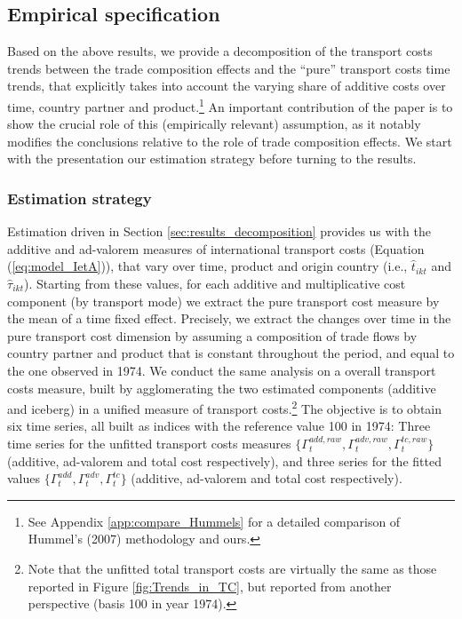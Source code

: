 \documentclass[a4paper,11pt]{article}
\begin{document}
\subsection{Empirical specification}

Based on the above results, we provide a decomposition of the transport costs trends between the trade composition effects and the ``pure'' transport costs time trends, that explicitly takes into account the varying share of additive costs over time, country partner and product.\footnote{See Appendix \ref{app:compare_Hummels} for a detailed comparison of Hummel's (2007) methodology and ours.} An important contribution of the paper is to show the crucial role of this (empirically relevant) assumption, as it notably modifies the conclusions relative to the role of trade composition effects.
We start with the presentation our estimation strategy before turning to the results.\smallskip

\subsubsection{Estimation strategy}

Estimation driven in Section \ref{sec:results_decomposition} provides us with the additive and ad-valorem measures of international transport costs (Equation (\ref{eq:model_IetA})), that vary over time, product and origin country (i.e., $\widehat{t}_{ikt}$ and $\widehat{\tau}_{ikt}$).
Starting from these values, for each additive and multiplicative cost component (by transport mode) we extract the pure transport cost measure by the mean of a time fixed effect.
Precisely, we extract the changes over time in the pure transport cost dimension by assuming a composition of trade flows by country partner and product that is constant throughout the period, and equal to the one observed in 1974.
We conduct the same analysis on a overall transport costs measure, built by agglomerating the two estimated components (additive and iceberg) in a unified measure of transport costs.\footnote{Note that the unfitted total transport costs are virtually the same as those reported in Figure \ref{fig:Trends_in_TC}, but reported from another perspective (basis 100 in year 1974).} The objective is to obtain six time series, all built as indices with the reference value 100 in 1974: Three time series for the unfitted transport costs measures $\{\Gamma^{add, raw}_t, \Gamma^{adv, raw}_t, \Gamma^{tc, raw}_t \}$  (additive, ad-valorem and total cost respectively), and three series for the fitted values $\{\Gamma^{add}_t, \Gamma^{adv}_t, \Gamma^{tc}_t \}$ (additive, ad-valorem and total cost respectively).
\end{document}
